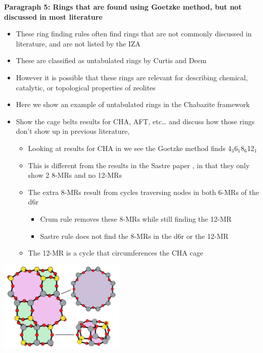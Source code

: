 \documentclass[11pt]{article}
\begin{document}
\textbf{\textbf{Paragraph 5: Rings that are found using Goetzke method, but not discussed in most literature}}
\begin{itemize}
\item These ring finding rules often find rings that are not commonly discussed in literature, and are not listed by the IZA
\item These are classified as untabulated rings by Curtis and Deem \cite{curtis-statistical-2003}
\item However it is possible that these rings are relevant for describing chemical, catalytic, or topological properties of zeolites
\item Here we show an example of untabulated rings in the Chabazite framework
\item Show the cage belts results for CHA, AFT, etc\ldots{} and discuss how those rings don't show up in previous literature, 
\begin{itemize}
\item Looking at results for CHA in  we see the Goetzke method finds 4\(_{\text{3}}\)\textbullet{}6\(_{\text{1}}\)\textbullet{}8\(_{\text{6}}\)\textbullet{}12\(_{\text{1}}\)
\item This is different from the results in the Sastre paper \cite{sastre-topological-2009}, in that they only show 2 8-MRs and no 12-MRs
\item The extra 8-MRs result from cycles traversing nodes in both 6-MRs of the d6r
\begin{itemize}
\item Crum rule removes these 8-MRs while still finding the 12-MR
\item Sastre rule does not find the 8-MRs in the d6r or the 12-MR
\end{itemize}
\item The 12-MR is a cycle that circumferences the CHA cage
\end{itemize}
\end{itemize}
\begin{center}
\includegraphics[width=0.45\textwidth]{../figures/completed-figures/cha-all-rings.pdf}
\end{center}
\end{document}
